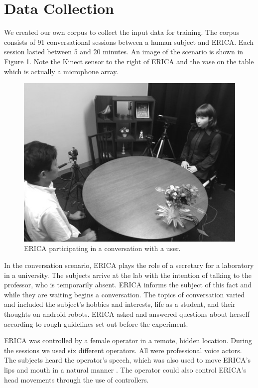 \documentclass[letterpaper]{article} %
\begin{document}
\section{Data Collection}\label{data}
We created our own corpus to collect the input data for training. The corpus consists of 91 conversational sessions between a human subject and ERICA. Each session lasted between 5 and 20 minutes. An image of the scenario is shown in Figure \ref{ericaconvo}. Note the Kinect sensor to the right of ERICA and the vase on the table which is actually a microphone array.

\begin{figure}
\centering
\includegraphics{ericaconvo.jpg}
\caption{ERICA participating in a conversation with a user.}
\label{ericaconvo}
\end{figure}

In the conversation scenario, ERICA plays the role of a secretary for a laboratory in a university. The subjects arrive at the lab with the intention of talking to the professor, who is temporarily absent. ERICA informs the subject of this fact and while they are waiting begins a conversation. The topics of conversation varied and included the subject's hobbies and interests, life as a student, and their thoughts on android robots. ERICA asked and answered questions about herself according to rough guidelines set out before the experiment.

ERICA was controlled by a female operator in a remote, hidden location. During the sessions we used six different operators. All were professional voice actors. The subjects heard the operator's speech, which was also used to move ERICA's lips and mouth in a natural manner \cite{Sakai2015}. The operator could also control ERICA's head movements through the use of controllers.
\end{document}
